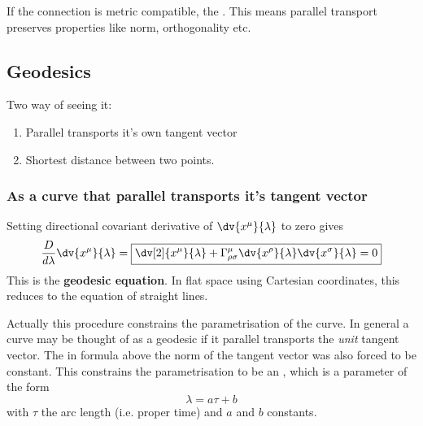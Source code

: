 

If the connection is metric compatible, the . This means parallel transport preserves properties like norm, orthogonality etc.

\subsection{Geodesics}
Two way of seeing it:
\begin{enumerate}
\item Parallel transports it's own tangent vector
\item Shortest distance between two points.
\end{enumerate}

\subsubsection{As a curve that parallel transports it's tangent vector}
Setting directional covariant derivative of $\dv{x^\mu}{\lambda}$ to zero gives
\[ \frac{D}{d\lambda}\dv{x^\mu}{\lambda} = \boxed{ \dv[2]{x^\mu}{\lambda} + \Gamma^\mu_{\rho\sigma}\dv{x^\rho}{\lambda}\dv{x^\sigma}{\lambda} = 0 } \]
This is the \textbf{geodesic equation}. In flat space using Cartesian coordinates, this reduces to the equation of straight lines.

Actually this procedure constrains the parametrisation of the curve. In general a curve may be thought of as a geodesic if it parallel transports the \emph{unit} tangent vector. The in formula above the norm of the tangent vector was also forced to be constant. This constrains the parametrisation to be an , which is a parameter of the form
\[ \lambda = a\tau + b \]
with $\tau$ the arc length (i.e. proper time) and $a$ and $b$ constants.

